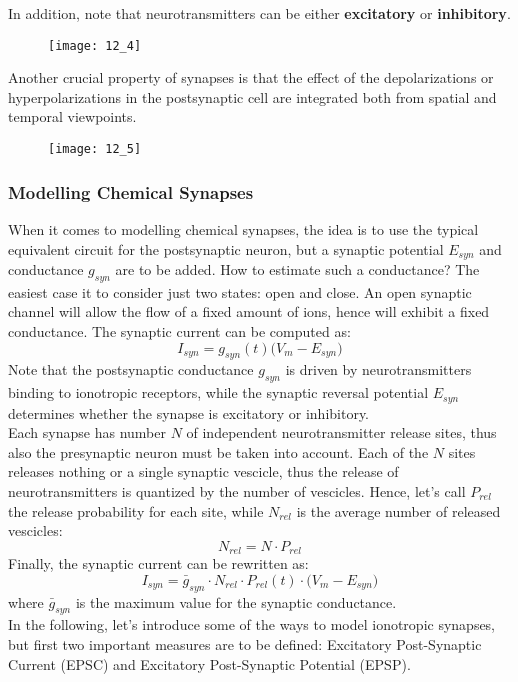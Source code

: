 In addition, note that neurotransmitters can be either \textbf{excitatory} or \textbf{inhibitory}.
\begin{figure}[H]
    \texttt{[image: 12\_4]}
    \centering
\end{figure}
Another crucial property of synapses is that the effect of the depolarizations or
hyperpolarizations in the postsynaptic cell are integrated both from spatial and
temporal viewpoints.
\begin{figure}[H]
    \texttt{[image: 12\_5]}
    \centering
\end{figure}
\subsubsection{Modelling Chemical Synapses}
When it comes to modelling chemical synapses, the idea is to use the typical
equivalent circuit for the postsynaptic neuron, but
a synaptic potential \(E_{syn}\) and conductance \(g_{syn}\) are to be added.
How to estimate such a conductance? The easiest case it to consider just two
states: open and close. An open synaptic channel will allow the flow of a fixed
amount of ions, hence will exhibit a fixed conductance. The synaptic current can be
computed as:
\begin{equation*}
    I_{syn}=g_{syn}(t)\bigl(V_{m}-E_{syn}\bigr)
\end{equation*}
Note that the postsynaptic conductance \(g_{syn}\) is driven by neurotransmitters
binding to ionotropic receptors, while the synaptic reversal potential \(E_{syn}\)
determines whether the synapse is excitatory or inhibitory.\\
Each synapse has number \(N\) of independent neurotransmitter release sites, thus
also the presynaptic neuron must be taken into account. Each of the \(N\) sites releases
nothing or a single synaptic vescicle, thus the release of neurotransmitters is
quantized by the number of vescicles. Hence, let's call \(P_{rel}\) the release
probability for each site, while \(N_{rel}\) is the average number of released vescicles:
\begin{equation*}
    N_{rel}=N\cdot{P_{rel}}
\end{equation*}
Finally, the synaptic current can be rewritten as:
\begin{equation*}
    I_{syn}=\bar{g}_{syn}\cdot{N_{rel}}\cdot{P_{rel}(t)}\cdot{\bigl(V_{m}-E_{syn}\bigr)}
\end{equation*}
where \(\bar{g}_{syn}\) is the maximum value for the synaptic conductance.\\
In the following, let's introduce some of the ways to model ionotropic
synapses, but first two important measures are to be defined:
Excitatory Post-Synaptic Current (EPSC) and Excitatory Post-Synaptic Potential (EPSP).
